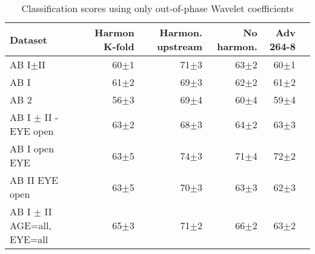 \documentclass[a4paper,11pt]{article}
\begin{document}
\begin{table}[!htp]\centering
\scriptsize
\begin{tabular}{lrrrrr}\toprule
Dataset &Harmon K-fold &Harmon. upstream &No harmon. &Adv 264-8 \\\midrule
AB I$\pm$II &60$\pm$1 &71$\pm$3 &63$\pm$2 &60$\pm$1 \\
AB I &61$\pm$2 &69$\pm$3 &62$\pm$2 &61$\pm$2 \\
AB 2 &56$\pm$3 &69$\pm$4 &60$\pm$4 &59$\pm$4 \\
AB I $\pm$ II - EYE open &63$\pm$2 &68$\pm$3 &64$\pm$2 &63$\pm$3 \\
AB I open EYE &63$\pm$5 &74$\pm$3 &71$\pm$4 &72$\pm$2 \\
AB II EYE open &63$\pm$5 &70$\pm$3 &63$\pm$3 &62$\pm$3 \\
AB I $\pm$ II AGE=all, EYE=all &65$\pm$3 &71$\pm$2 &66$\pm$2 &63$\pm$2 \\
\bottomrule
\end{tabular}
\caption{Classification scores using only out-of-phase Wavelet coefficients}\label{}
\end{table}




\end{document}
